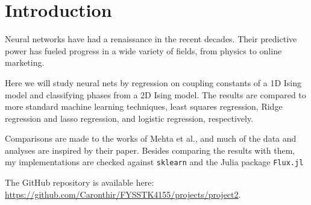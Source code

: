 \section{Introduction}

Neural networks have had a renaissance in the recent decades. Their predictive
power has fueled progress in a wide variety of fields, from physics to online
marketing.

Here we will study neural nets by regression on coupling constants of  a 1D Ising
model and classifying phases from a 2D Ising model. The results are compared to
more standard machine learning techniques, least squares regression, Ridge
regression and lasso regression, and logistic regression, respectively.

Comparisons are made to the works of Mehta et al.\cite{mehta}, and much of the data
and analyses are inspired by their paper. Besides comparing the results with
them, my implementations are checked against \texttt{sklearn} and the Julia
package \texttt{Flux.jl}

The GitHub repository is available here: \url{https://github.com/Caronthir/FYSSTK4155/projects/project2}.
